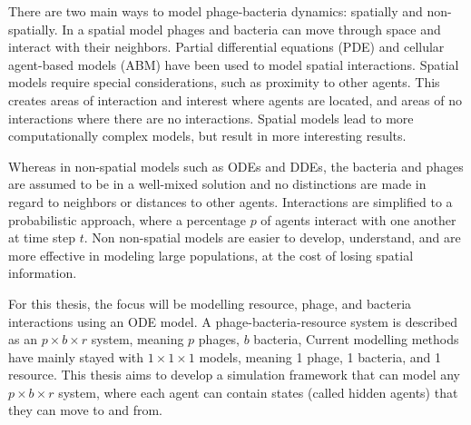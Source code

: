 There are two main ways to model phage-bacteria dynamics: spatially and non-spatially.
In a spatial model phages and bacteria can move through space and interact with their neighbors. 
Partial differential equations (PDE) and cellular agent-based models (ABM) have been used to model spatial interactions.
Spatial models require special considerations, such as proximity to other agents.
This creates areas of interaction and interest where agents are located, and areas of no interactions where there are no interactions.
Spatial models lead to more computationally complex models, but result in more interesting results. 

Whereas in non-spatial models such as ODEs and DDEs, the bacteria and phages are assumed to be in a well-mixed solution and no distinctions are made in regard to neighbors or distances to other agents. 
Interactions are simplified to a probabilistic approach, where a percentage $p$ of agents interact with one another at time step $t$.
Non non-spatial models are easier to develop, understand, and are more effective in modeling large populations, at the cost of losing spatial information. 

For this thesis, the focus will be modelling resource, phage, and bacteria interactions using an ODE model. 
A phage-bacteria-resource system is described as an $p\times b \times r$ system, meaning $p$ phages, $b$ bacteria, 
Current modelling methods have mainly stayed with $1\times 1 \times 1$ models, meaning 1 phage, 1 bacteria, and 1 resource. 
This thesis aims to develop a simulation framework that can model any $p\times b \times r$ system, where each agent can contain states (called hidden agents) that they can move to and from. 
\newline 

